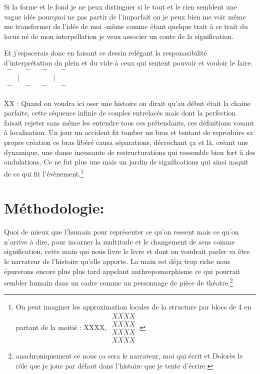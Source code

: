 \documentclass{article}
\begin{document}
Si la forme et le fond je ne peux distinguer si le tout et le rien semblent une vague idée pourquoi ne pas partir de l'imparfait ou je peux bien me voir même me transformer de l'idée de moi -même comme étant quelque trait à ce trait du locus né de mon interpellation je veux associer un conte de la signification.  
 
 Et j'espacerais donc en faisant ce dessin relégant la responasibilité d'interprétation du plein et du vide à ceux qui sentent pouvoir et vouloir le faire.
$
{\scriptscriptstyle\begin{matrix}
- &   & - &   & - &   & - \\
  & | &   &   &   &  | &   \\
- &   & - &   & - &   & - \\
\end{matrix}}$
 
XX   :  Quand  on voudra ici oser une histoire on dirait qu'au début était la chaine parfaite, cette séquence infinie de couples entrelacés mais dont la perfection faisait rejeter sans même les entendre  tous ces prétendants,  ces définitions vouant  à localisation. Un jour un accident fit tomber un bras et tentant de reproduire sa propre création ce bras libéré causa séparations, décrochant ça et là, créant une dynamique,  une danse incessante de restructurations qui ressemble bien fort à des ondulations.  Ce ne fut plus une mais un jardin de significations qui ainsi naquit de ce qui fit l'évènement.\footnote{ On peut imaginer les approximation locales de la structure par blocs de 4 en partant de la moitié : XXXX, $\begin{array}{c} XXXX\\  XXXX \\XXXX \\ XXXX\end{array}$.}
   
\section{Méthodologie:}

Quoi de mieux que l'humain pour représenter ce qu'on ressent mais ce qu'on n'arrive à dire, pour incarner la multitude et le changement de sens comme signification, cette main qui nous livre le livre et dont on voudrait parler va être le narrateur de l'histoire qu'elle apporte. La main est déja trop riche nous épurerons encore plus plus tard appelant anthropomorphisme ce qui pourrait sembler  humain dans un cadre comme un personnage de pièce de théatre.\footnote{anachroniquement ce nous ca sera le narrateur, moi qui écrit et Dolorès le rôle que je joue par défaut dans l'histoire que je tente d'écrire.} 
 
\end{document}
